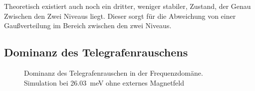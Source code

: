 \documentclass[main.tex]{subfiles}
\begin{document}
Theoretisch existiert auch noch ein dritter, weniger stabiler, Zustand, der Genau Zwischen den Zwei Niveaus liegt. Dieser sorgt für die Abweichung von einer Gaußverteilung im Bereich zwischen den zwei Niveaus. 


\subsection{Dominanz des Telegrafenrauschens}
\begin{figure}[H]
    \centering
    \caption{Dominanz des Telegrafenrauschen in der Frequenzdomäne. Simulation bei \SI{26.03}{\milli\electronvolt} ohne externes Magnetfeld }\label{fig:dominanz-tgr}
\end{figure}
\end{document}
